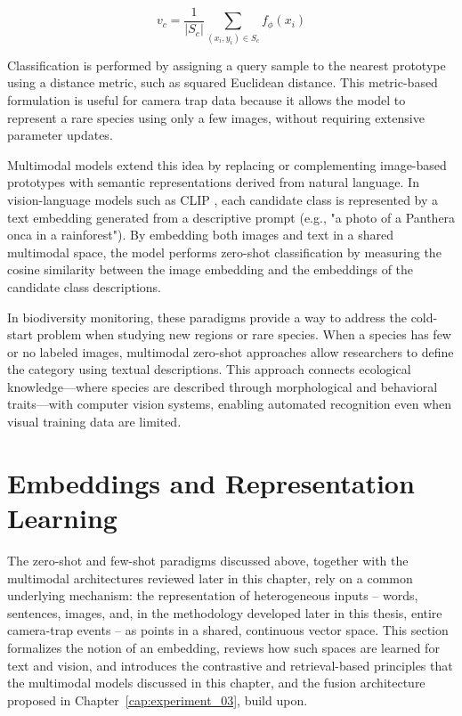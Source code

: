 $$v_c = \frac{1}{|S_c|} \sum_{(x_i, y_i) \in S_c} f_\phi(x_i)$$

Classification is performed by assigning a query sample to the nearest prototype using a distance metric, such as squared Euclidean distance. This metric-based formulation is useful for camera trap data because it allows the model to represent a rare species using only a few images, without requiring extensive parameter updates.

Multimodal models extend this idea by replacing or complementing image-based prototypes with semantic representations derived from natural language. In vision-language models such as CLIP \citep{radford2021learning}, each candidate class is represented by a text embedding generated from a descriptive prompt (e.g., "a photo of a Panthera onca in a rainforest"). By embedding both images and text in a shared multimodal space, the model performs zero-shot classification by measuring the cosine similarity between the image embedding and the embeddings of the candidate class descriptions.

In biodiversity monitoring, these paradigms provide a way to address the cold-start problem when studying new regions or rare species. When a species has few or no labeled images, multimodal zero-shot approaches allow researchers to define the category using textual descriptions. This approach connects ecological knowledge—where species are described through morphological and behavioral traits—with computer vision systems, enabling automated recognition even when visual training data are limited.

\section{Embeddings and Representation Learning}
\label{sec:embeddings}

The zero-shot and few-shot paradigms discussed above, together with the multimodal architectures reviewed later in this chapter, rely on a common underlying mechanism: the representation of heterogeneous inputs -- words, sentences, images, and, in the methodology developed later in this thesis, entire camera-trap events -- as points in a shared, continuous vector space. This section formalizes the notion of an embedding, reviews how such spaces are learned for text and vision, and introduces the contrastive and retrieval-based principles that the multimodal models discussed in this chapter, and the fusion architecture proposed in Chapter~\ref{cap:experiment_03}, build upon.

